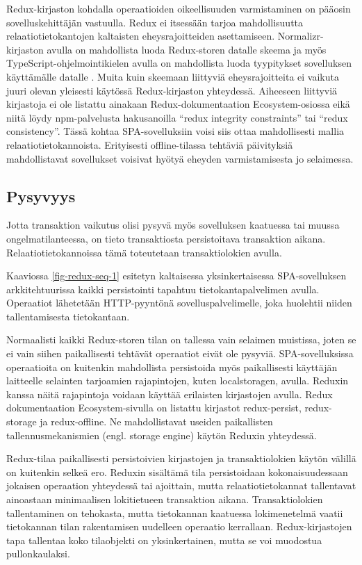 \documentclass[finnish,twoside,censored,csm,sw-track-2018]{HYthesisML}
\begin{document}
Redux-kirjaston kohdalla operaatioiden oikeellisuuden varmistaminen on pääosin sovelluskehittäjän vastuulla. Redux ei itsessään tarjoa mahdollisuutta relaatiotietokantojen kaltaisten eheysrajoitteiden asettamiseen. Normalizr-kirjaston avulla on mahdollista luoda Redux-storen datalle skeema \citep{redux-normalizing} ja myös TypeScript-ohjelmointikielen avulla on mahdollista luoda tyypitykset sovelluksen käyttämälle datalle \citep{redux-typescript}. Muita kuin skeemaan liittyviä eheysrajoitteita ei vaikuta juuri olevan yleisesti käytössä Redux-kirjaston yhteydessä. Aiheeseen liittyviä kirjastoja ei ole listattu ainakaan Redux-dokumentaation Ecosystem-osiossa eikä niitä löydy npm-palvelusta hakusanoilla ``redux integrity constraints'' tai ``redux consistency''. Tässä kohtaa SPA-sovelluksiin voisi siis ottaa mahdollisesti mallia relaatiotietokannoista. Erityisesti offline-tilassa tehtäviä päivityksiä mahdollistavat sovellukset voisivat hyötyä eheyden varmistamisesta jo selaimessa.

\subsection{Pysyvyys}

Jotta transaktion vaikutus olisi pysyvä myös sovelluksen kaatuessa tai muussa ongelmatilanteessa, on tieto transaktiosta persistoitava transaktion aikana. Relaatiotietokannoissa tämä toteutetaan transaktiolokien avulla.

Kaaviossa \ref{fig-redux-seq-1} esitetyn kaltaisessa yksinkertaisessa SPA-sovelluksen arkkitehtuurissa kaikki persistointi tapahtuu tietokantapalvelimen avulla. Operaatiot lähetetään HTTP-pyyntönä sovelluspalvelimelle, joka huolehtii niiden tallentamisesta tietokantaan.

Normaalisti kaikki Redux-storen tilan on tallessa vain selaimen muistissa, joten se ei vain siihen paikallisesti tehtävät operaatiot eivät ole pysyviä. SPA-sovelluksissa operaatioita on kuitenkin mahdollista persistoida myös paikallisesti käyt\-täjän laitteelle selainten tarjoamien rajapintojen, kuten localstoragen, avulla. Reduxin kanssa näitä rajapintoja voidaan käyttää erilaisten kirjastojen avulla. Redux dokumentaation Ecosystem-sivulla \citep{redux-ecosystem} on listattu kirjastot redux-persist, redux-storage ja redux-offline. Ne mahdollistavat useiden paikallisten tallennusmekanismien (engl. storage engine) käytön Reduxin yhteydessä. 

Redux-tilaa paikallisesti persistoivien kirjastojen ja transaktiolokien käytön välillä on kuitenkin selkeä ero. Reduxin sisältämä tila persistoidaan kokonaisuudessaan jokaisen operaation yhteydessä tai ajoittain, mutta relaatiotietokannat tallentavat ainoastaan minimaalisen lokitietueen transaktion aikana. Transaktiolokien tallentaminen on tehokasta, mutta tietokannan kaatuessa lokimenetelmä vaatii tietokannan tilan rakentamisen uudelleen operaatio kerrallaan. Redux-kirjastojen tapa tallentaa koko tilaobjekti on yksinkertainen, mutta se voi muodostua pullonkaulaksi.
\end{document}
